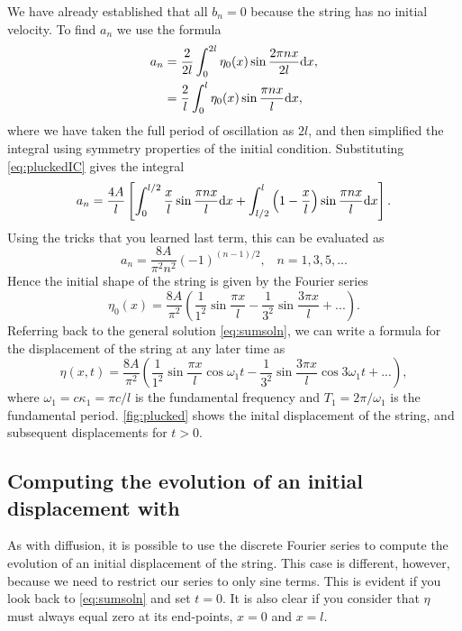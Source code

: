 \documentclass[11pt,twoside,a4paper]{article}
\begin{document}
We have already established that all $b_n=0$ because the string has no
initial velocity.  To find $a_n$ we use the formula
\begin{align}
  a_n &= \frac{2}{2l}\int_0^{2l}\eta_0(x)\sin\frac{2\pi nx}{2l}\textrm{d} x,\nonumber\\
      &= \frac{2}{l}\int_0^{l}\eta_0(x)\sin\frac{\pi nx}{l}\textrm{d} x,
\end{align}
where we have taken the full period of oscillation as $2l$, and then
simplified the integral using symmetry properties of the initial
condition.  Substituting \autoref{eq:pluckedIC} gives the integral
\begin{displaymath}
  a_n = \frac{4A}{l}\left[\int_0^{l/2}\frac{x}{l}\sin\frac{\pi nx}{l}\textrm{d} x + 
    \int_{l/2}^l\left(1-\frac{x}{l}\right)\sin\frac{\pi nx}{l}\textrm{d} x\right].
\end{displaymath}
Using the tricks that you learned last term, this can be evaluated as
\begin{equation}
  \label{eq:4}
  a_n = \frac{8A}{\pi^2n^2}(-1)^{(n-1)/2},\;\;\;n=1,3,5,...
\end{equation}
Hence the initial shape of the string is given by the Fourier series
\begin{equation}
  \label{eq:5}
  \eta_0(x) = \frac{8A}{\pi^2}\left(\frac{1}{1^2}\sin\frac{\pi x}{l} - 
    \frac{1}{3^2}\sin\frac{3\pi x}{l} + ...\right).
\end{equation}
Referring back to the general solution \autoref{eq:sumsoln}, we can
write a formula for the displacement of the string at any later time
as
\begin{equation}
  \label{eq:6}
  \eta(x,t) = \frac{8A}{\pi^2}\left(\frac{1}{1^2}\sin\frac{\pi x}{l}\cos\omega_1t - 
    \frac{1}{3^2}\sin\frac{3\pi x}{l}\cos 3\omega_1t + ...\right),
\end{equation}
where $\omega_1 = c\kappa_1 = \pi c/l$ is the fundamental frequency
and $T_1 = 2\pi/\omega_1$ is the fundamental
period. \autoref{fig:plucked} shows the inital displacement of the
string, and subsequent displacements for $t>0$.

\subsection{Computing the evolution of an initial displacement with
  \Mlab}

As with diffusion, it is possible to use the discrete Fourier series
to compute the evolution of an initial displacement of the string.
This case is different, however, because we need to restrict our
series to only sine terms.  This is evident if you look back to
\autoref{eq:sumsoln} and set $t=0$.  It is also clear if you consider
that $\eta$ must always equal zero at its end-points, $x=0$ and $x=l$.
\end{document}
